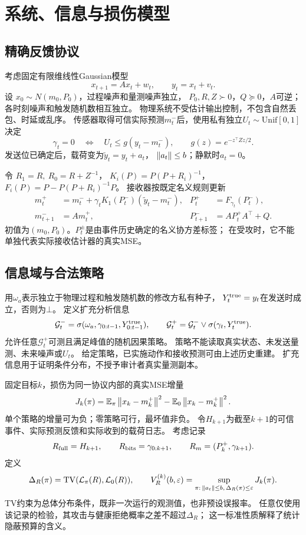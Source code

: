 \section{系统、信息与损伤模型}
\subsection{精确反馈协议}
考虑固定有限维线性Gaussian模型
\begin{equation}
x_{t+1}=Ax_t+w_t,\qquad y_t=x_t+v_t .
\label{eq:model}
\end{equation}
设 $x_0\sim N(m_0,P_0)$，过程噪声和量测噪声独立，
$P_0,R,Z\succ0$，$Q\succeq0$，$A$可逆；各时刻噪声和触发随机数相互独立。
物理系统不受估计输出控制，不包含自然丢包、时延或乱序。
传感器取得可信实际预测$m_t^-$后，使用私有独立$U_t\sim\mathrm{Unif}[0,1]$决定
\begin{equation}
\gamma_t=0\quad\Longleftrightarrow\quad
U_t\le g(y_t-m_t^-),\qquad g(z)=e^{-z^\top Zz/2}.
\label{eq:trigger}
\end{equation}
发送位已确定后，载荷变为$\tilde y_t=y_t+a_t$，
$\left\|a_t\right\|\le b$；静默时$a_t=0$。

令 $R_1=R,\ R_0=R+Z^{-1}$，
$K_i(P)=P(P+R_i)^{-1}$，$F_i(P)=P-P(P+R_i)^{-1}P$。
接收器按既定名义规则更新
\begin{align}
m_t^+&=m_t^-+\gamma_tK_1(P_t^-)(\tilde y_t-m_t^-),&
P_t^+&=F_{\gamma_t}(P_t^-),\label{eq:receive}\\
m_{t+1}^-&=Am_t^+,& P_{t+1}^-&=AP_t^+A^\top+Q.\nonumber
\end{align}
初值为$(m_0,P_0)$。$P_t^\pm$是由事件历史确定的名义协方差标签；
在受攻时，它不能单独代表实际接收估计器的真实MSE。

\subsection{信息域与合法策略}
用$\omega_a$表示独立于物理过程和触发随机数的修改方私有种子，
$Y_t^{\rm true}=y_t$在发送时成立，否则为$\bot$。
定义扩充分析信息
\[
\mathcal G_t^-=\sigma(\omega_a,\gamma_{0:t-1},Y^{\rm true}_{0:t-1}),\qquad
\mathcal G_t^+=\mathcal G_t^-\vee\sigma(\gamma_t,Y_t^{\rm true}).
\]
允许任意$\mathcal G_t^+$可测且满足峰值的随机因果策略。
策略不能读取真实状态、未发送量测、未来噪声或$U_t$。
给定策略，已实施动作和接收预测可由上述历史重建。
扩充信息用于证明条件分布，不授予审计者真实量测副本。

固定目标$k$，损伤为同一协议内部的真实MSE增量
\begin{equation}
J_k(\pi)=\mathbb E_\pi\left\|x_k-m_k^+\right\|^2-\mathbb E_0\left\|x_k-m_k^+\right\|^2.
\label{eq:damage}
\end{equation}
单个策略的增量可为负；零策略可行，最坏值非负。
令$H_{k+1}$为截至$k+1$的可信事件、实际预测反馈和实际收到的载荷日志。
考虑记录
\[
R_{\rm full}=H_{k+1},\qquad
R_{\rm bits}=\gamma_{0:k+1},\qquad
R_m=(P_k^+,\gamma_{k+1}).
\]
定义
\begin{equation}
\Delta_R(\pi)=\operatorname{TV}(\mathcal L_\pi(R),\mathcal L_0(R)),\qquad
V_R^{(k)}(b,\varepsilon)=
\sup_{\pi:\,\left\|a_t\right\|\le b,\,\Delta_R(\pi)\le\varepsilon}J_k(\pi).
\label{eq:value}
\end{equation}
TV约束为总体分布条件，既非一次运行的观测值，也非预设误报率。
任意仅使用该记录的检验，其攻击与健康拒绝概率之差不超过$\Delta_R$；
这一标准性质解释了统计隐蔽预算的含义。

